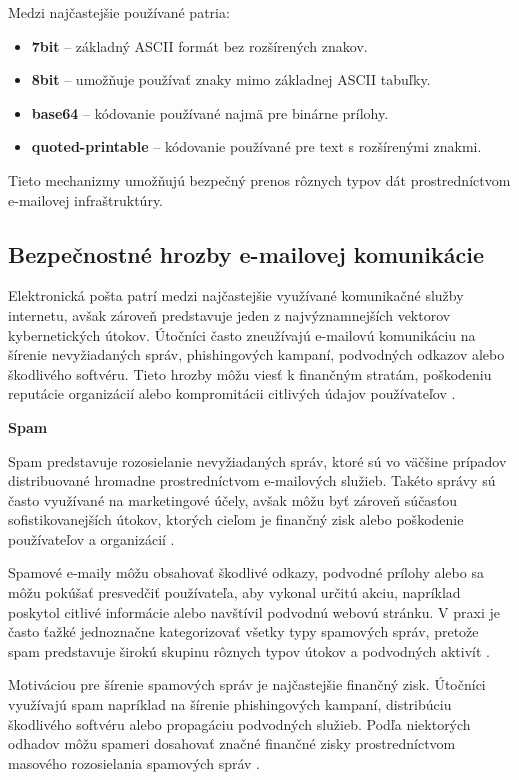 \documentclass[conference]{IEEEtran}
\begin{document}
Medzi najčastejšie používané patria\cite{rfc2045}:

\begin{itemize}
\item \textbf{7bit} – základný ASCII formát bez rozšírených znakov.
\item \textbf{8bit} – umožňuje používať znaky mimo základnej ASCII tabuľky.
\item \textbf{base64} – kódovanie používané najmä pre binárne prílohy.
\item \textbf{quoted-printable} – kódovanie používané pre text s 
rozšírenými znakmi.
\end{itemize}

Tieto mechanizmy umožňujú bezpečný prenos rôznych typov dát 
prostredníctvom e-mailovej infraštruktúry.

\subsection{Bezpečnostné hrozby e-mailovej komunikácie}

Elektronická pošta patrí medzi najčastejšie využívané komunikačné služby internetu, 
avšak zároveň predstavuje jeden z najvýznamnejších vektorov kybernetických útokov. 
Útočníci často zneužívajú e-mailovú komunikáciu na šírenie nevyžiadaných správ, 
phishingových kampaní, podvodných odkazov alebo škodlivého softvéru. 
Tieto hrozby môžu viesť k finančným stratám, poškodeniu reputácie organizácií 
alebo kompromitácii citlivých údajov používateľov \cite{karim2019spam}.

\textbf{Spam}

Spam predstavuje rozosielanie nevyžiadaných správ, ktoré sú vo väčšine prípadov 
distribuované hromadne prostredníctvom e-mailových služieb. Takéto správy sú 
často využívané na marketingové účely, avšak môžu byť zároveň súčasťou 
sofistikovanejších útokov, ktorých cieľom je finančný zisk alebo poškodenie 
používateľov a organizácií \cite{karim2019spam}.

Spamové e-maily môžu obsahovať škodlivé odkazy, podvodné prílohy alebo sa môžu 
pokúšať presvedčiť používateľa, aby vykonal určitú akciu, napríklad poskytol 
citlivé informácie alebo navštívil podvodnú webovú stránku. V praxi je často 
ťažké jednoznačne kategorizovať všetky typy spamových správ, pretože spam 
predstavuje širokú skupinu rôznych typov útokov a podvodných aktivít 
\cite{karim2019spam}.

Motiváciou pre šírenie spamových správ je najčastejšie finančný zisk. 
Útočníci využívajú spam napríklad na šírenie phishingových kampaní, 
distribúciu škodlivého softvéru alebo propagáciu podvodných služieb. 
Podľa niektorých odhadov môžu spameri dosahovať značné finančné zisky 
prostredníctvom masového rozosielania spamových správ \cite{karim2019spam}.
\end{document}
